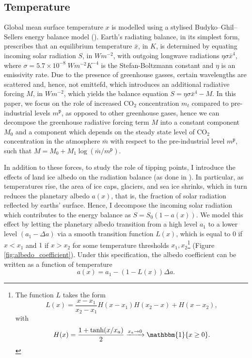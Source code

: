 \documentclass[../../main.tex]{subfiles}
\begin{document}
\subsection{Temperature}

Global mean surface temperature $x$ is modelled using a stylised Budyko–Ghil–Sellers energy balance model (\cite{hogg_glacial_2008, ashwin_extreme_2020}). Earth's radiating balance, in its simplest form, prescribes that an equilibrium temperature $\bar x$, in $\unit{K}$, is determined by equating incoming solar radiation $S$, in $\unit{W}\unit{m}^{-2}$, with outgoing longwave radiations $\eta \sigma \bar{x}^4$, where $\sigma = 5.7 \times 10^{-8} \; \unit{W} \unit{m}^{-2} \unit{K}^{-4}$ is the Stefan-Boltzmann constant and $\eta$ is an emissivity rate. Due to the presence of greenhouse gasses, certain wavelengths are scattered and, hence, not emittefd, which introduces an additional radiative forcing $M$, in $\unit{W}\unit{m}^{-2}$, which yields the balance equation $S = \eta \sigma \bar{x}^4 - M$. In this paper, we focus on the role of increased CO$_2$ concentration $m_t$ compared to pre-industrial levels $m^{\mathtt{p}}$, as opposed to other greenhouse gases, hence we can decompose the greenhouse radiative forcing term $M$ into a constant component $M_0$ and a component which depends on the steady state level of CO$_2$ concentration in the atmosphere $\bar{m}$ with respect to the pre-industrial level $m^{\mathtt{p}}$, such that $M = M_0 + M_1 \log(\bar{m} / m^{\mathtt{p}})$.

In addition to these forces, to study the role of tipping points, I introduce the effects of land ice albedo on the radiation balance (as done in \cite{ghil_topics_2011,dijkstra_sensitivity_2015}). In particular, as temperatures rise, the area of ice caps, glaciers, and sea ice shrinks, which in turn reduces the planetary albedo $a(x)$, that is, the fraction of solar radiation reflected by earths' surface. Hence, I decompose the incoming solar radiation which contributes to the energy balance as $S = S_0 (1 - a(x))$. We model this effect by letting the planetary albedo transition from a high level $a_1$ to a lower level $(a_1 - \Delta a)$ via a smooth transition function $L(x)$, which is equal to $0$ if $x < x_1$ and $1$ if $x > x_2$ for some temperature thresholds $x_1, x_2$\footnote{
    The function $L$ takes the form \begin{equation}
        L(x) = \frac{x - x_1}{x_2 - x_1} H(x - x_1) H(x_2 - x) + H(x - x_2),
    \end{equation} with \begin{equation}
        H(x) = \frac{1 + \tanh(x / x_a)}{2} \xrightarrow{x_a \rightarrow 0} \mathbbm{1} \{x \geq 0\}.
    \end{equation}
} (Figure \ref{fig:albedo_coefficient}). Under this specification, the albedo coefficient can be written as a function of temperature \begin{equation} \label{eq:assumption:albedo}
    a(x) = a_1 - (1 - L(x)) \Delta a.
\end{equation} 
\end{document}
